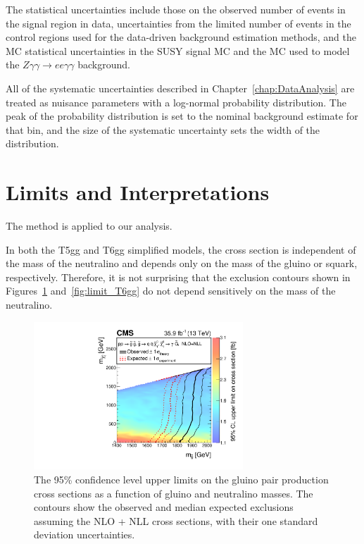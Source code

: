 The statistical uncertainties include those on the 
observed number of events in the signal region in data, uncertainties from the limited number of events
in the control regions used for the data-driven background estimation methods, and the MC statistical uncertainties 
in the SUSY signal MC and the MC used to model the $Z\gamma\gamma\rightarrow ee \gamma\gamma$ 
background.

All of the systematic uncertainties described in Chapter~\ref{chap:DataAnalysis} are treated as nuisance parameters
with a log-normal probability distribution. The peak of the probability distribution 
is set to the nominal background estimate for that bin, and the size of the systematic uncertainty 
sets the width of the distribution. 

\section{Limits and Interpretations}
\label{sec:limits}

The \cls method \cite{Junk:1999kv, Read:2002hq} is applied to our analysis.

In both the T5gg and T6gg simplified models, the cross section is independent of the mass of the neutralino and 
depends only on the mass of the gluino or squark, respectively. Therefore, it is not surprising that the exclusion contours
shown in Figures~\ref{fig:limit_T5gg} and~\ref{fig:limit_T6gg}
do not depend sensitively on the mass of the neutralino. 

\begin{figure}[h]
\begin{center}
\includegraphics[width=0.7\textwidth]{Figures/Results/T5ggXSEC.pdf}
\end{center}
    \caption{The 95\% confidence level upper limits on the gluino pair
        production cross sections as a function of gluino and neutralino masses.
        The contours show the observed and median expected exclusions assuming
        the NLO + NLL cross sections, with their one standard deviation
	uncertainties.}
    \label{fig:limit_T5gg}
\end{figure}

